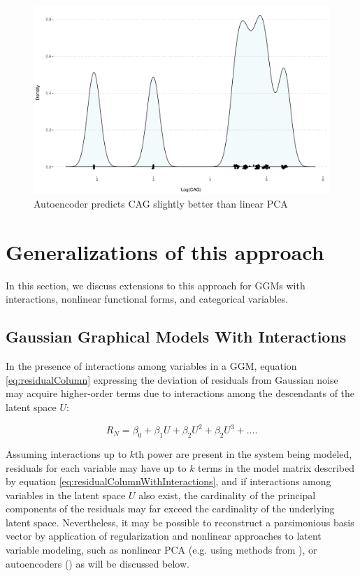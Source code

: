 \documentclass{article}
\begin{document}
\begin{figure}[ht!]
  \centering
    \includegraphics[width=\linewidth,page=2]{./images/cagPlots.pdf}
    \caption{\label{fig_cag_linear} Autoencoder predicts CAG slightly better than linear PCA}
\end{figure}
\medskip


\section{Generalizations of this approach}
In this section, we discuss extensions to this approach for GGMs with interactions, nonlinear functional forms, and categorical variables. 

\subsection{Gaussian Graphical Models With Interactions}
In the presence of interactions among variables in a GGM, equation \ref{eq:residualColumn} expressing the deviation of residuals from Gaussian noise may acquire higher-order terms due to interactions among the descendants of the latent space $U$:

\begin{equation}
R_N = \beta_0 + \beta_1 U + \beta_2 U^2 + \beta_2 U^3 + \dots.
\label{eq:residualColumnWithInteractions}
\end{equation}

Assuming interactions up to $k$th power are present in the system being modeled, residuals for each variable may have up to $k$ terms in the model matrix described by equation \ref{eq:residualColumnWithInteractions}, and if interactions among variables in the latent space $U$ also exist, the cardinality of the principal components of the residuals may far exceed the cardinality of the underlying latent space.  Nevertheless, it may be possible to reconstruct a parsimonious basis vector by application of regularization and nonlinear approaches to latent variable modeling, such as nonlinear PCA (e.g. using methods from \cite{karatzoglou_kernlab_2004}), or autoencoders (\cite{louizos_causal_2017}) as will be discussed below.
\end{document}
